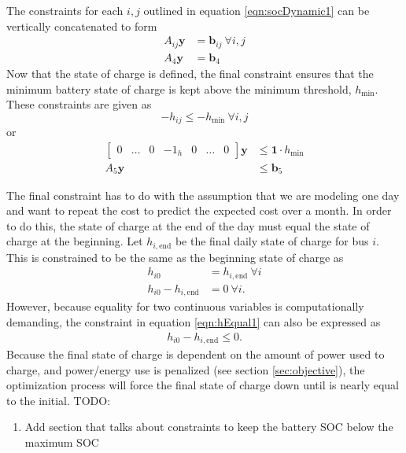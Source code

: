 The constraints for each $i,j$ outlined in equation \ref{eqn:socDynamic1} can be vertically concatenated to form
\begin{equation}\label{eqn:socDynamic3} \begin{aligned}
	A_{ij}\mathbf{y} &= \mathbf{b}_{ij} \ \forall i,j \\
	A_4\mathbf{y} &= \mathbf{b}_4
\end{aligned} \end{equation}
Now that the state of charge is defined, the final constraint ensures that the minimum battery state of charge is kept above the minimum threshold, $h_{\text{min}}$. These constraints are given as
\begin{equation}
	-h_{ij} \le -h_{\text{min}} \ \forall i,j
\end{equation}
or 
\begin{equation} \begin{aligned}
	\begin{bmatrix}0 & \hdots & 0 & -1_{h} & 0 & \hdots & 0\end{bmatrix} \mathbf{y} &\le \mathbf{1}\cdot h_{\text{min}}\\ 
		A_5\mathbf{y} &\le \mathbf{b}_5
\end{aligned} \end{equation}
\par The final constraint has to do with the assumption that we are modeling one day and want to repeat the cost to predict the expected cost over a month. In order to do this, the state of charge at the end of the day must equal the state of charge at the beginning. Let $h_{i,\text{end}}$ be the final daily state of charge for bus $i$. This is constrained to be the same as the beginning state of charge as
\begin{equation} \label{eqn:hEqual1} \begin{aligned}
	h_{i0} &= h_{i,\text{end}} \ \forall i \\
	h_{i0} - h_{i,\text{end}} &= 0 \ \forall i.  
\end{aligned} \end{equation}
However, because equality for two continuous variables is computationally demanding, the constraint in equation \ref{eqn:hEqual1} can also be expressed as 
\begin{equation} \begin{aligned}
	h_{i0} - h_{i,\text{end}} \le 0.
\end{aligned} \end{equation}
Because the final state of charge is dependent on the amount of power used to charge, and power/energy use is penalized (see section \ref{sec:objective}), the optimization process will force the final state of charge down until is nearly equal to the initial.
TODO:
\begin{enumerate}
	\item Add section that talks about constraints to keep the battery SOC below the maximum SOC
\end{enumerate}
